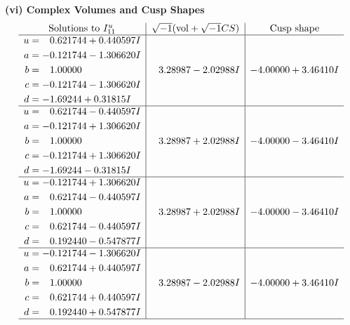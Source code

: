 \documentclass[1p]{elsarticle_modified}
\theoremstyle{definition}
\newcommand{\I}{\sqrt{-1}}
\begin{document}
\newpage\flushleft \textbf{(vi) Complex Volumes and Cusp Shapes}
$$\begin{array}{c|c|c}  
\text{Solutions to }I^u_{11}& \I (\text{vol} + \sqrt{-1}CS) & \text{Cusp shape}\\
 \hline 
\begin{aligned}
u &= \phantom{-}0.621744 + 0.440597 I \\
a &= -0.121744 - 1.306620 I \\
b &= \phantom{-}1.00000\phantom{ +0.000000I} \\
c &= -0.121744 - 1.306620 I \\
d &= -1.69244 + 0.31815 I\end{aligned}
 & \phantom{-}3.28987 - 2.02988 I & -4.00000 + 3.46410 I \\ \hline\begin{aligned}
u &= \phantom{-}0.621744 - 0.440597 I \\
a &= -0.121744 + 1.306620 I \\
b &= \phantom{-}1.00000\phantom{ +0.000000I} \\
c &= -0.121744 + 1.306620 I \\
d &= -1.69244 - 0.31815 I\end{aligned}
 & \phantom{-}3.28987 + 2.02988 I & -4.00000 - 3.46410 I \\ \hline\begin{aligned}
u &= -0.121744 + 1.306620 I \\
a &= \phantom{-}0.621744 - 0.440597 I \\
b &= \phantom{-}1.00000\phantom{ +0.000000I} \\
c &= \phantom{-}0.621744 - 0.440597 I \\
d &= \phantom{-}0.192440 - 0.547877 I\end{aligned}
 & \phantom{-}3.28987 + 2.02988 I & -4.00000 - 3.46410 I \\ \hline\begin{aligned}
u &= -0.121744 - 1.306620 I \\
a &= \phantom{-}0.621744 + 0.440597 I \\
b &= \phantom{-}1.00000\phantom{ +0.000000I} \\
c &= \phantom{-}0.621744 + 0.440597 I \\
d &= \phantom{-}0.192440 + 0.547877 I\end{aligned}
 & \phantom{-}3.28987 - 2.02988 I & -4.00000 + 3.46410 I\\
 \hline 
 \end{array}$$\newpage\newpage\renewcommand{\arraystretch}{1}
\end{document}
